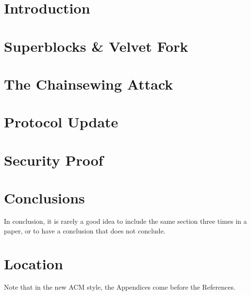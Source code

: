 \section{Introduction}
\cite{Backbone}\cite{nakamoto}\cite{NIPoPoWs}\cite{Zamyatin}\cite{selfish_mining}

\section{Superblocks \& Velvet Fork}


\section{The Chainsewing Attack}


\section{Protocol Update}


\section{Security Proof}


\section{Conclusions}

In conclusion, it is rarely a good idea to include the same section three times in a paper, or to have a conclusion that does not conclude.

\appendix

\section{Location}

Note that in the new ACM style, the Appendices come before the References.

\begin{acks}
\end{acks}
